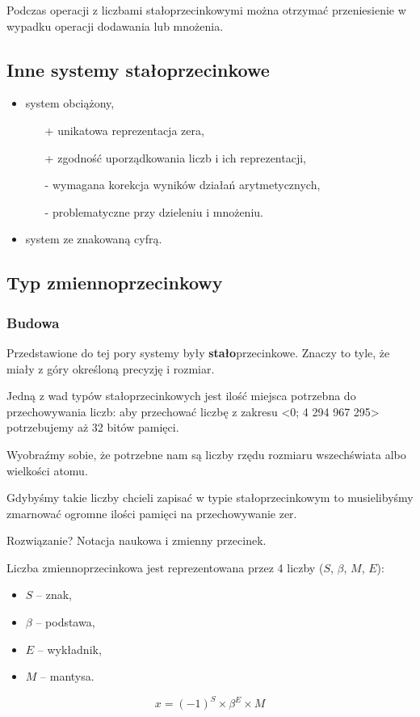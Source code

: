 Podczas operacji z liczbami stałoprzecinkowymi można otrzymać przeniesienie w wypadku operacji dodawania lub mnożenia.

\subsection{Inne systemy stałoprzecinkowe}
\begin{itemize}
	\setlength\itemsep{1pt}
	\item system obciążony,
	\begin{itemize}
		\setlength\itemsep{1pt}
		\item[+] unikatowa reprezentacja zera,
		\item[+] zgodność uporządkowania liczb i ich reprezentacji,
		\item[-] wymagana korekcja wyników działań arytmetycznych,
		\item[-] problematyczne przy dzieleniu i mnożeniu.
	\end{itemize}
	\item system ze znakowaną cyfrą.
\end{itemize}

\subsection{Typ zmiennoprzecinkowy}
\subsubsection{Budowa}
Przedstawione do tej pory systemy były \textbf{stało}przecinkowe.
Znaczy to tyle, że miały z góry określoną precyzję i rozmiar.

Jedną z wad typów stałoprzecinkowych jest ilość miejsca potrzebna do przechowywania liczb: aby przechować liczbę z zakresu <0; 4 294 967 295> potrzebujemy aż 32 bitów pamięci.

Wyobraźmy sobie, że potrzebne nam są liczby rzędu rozmiaru wszechświata albo wielkości atomu.

Gdybyśmy takie liczby chcieli zapisać w typie stałoprzecinkowym to musielibyśmy zmarnować ogromne ilości pamięci na przechowywanie zer.

Rozwiązanie? Notacja naukowa i zmienny przecinek.

Liczba zmiennoprzecinkowa jest reprezentowana przez 4 liczby ($S$, $\beta$, $M$, $E$):
\begin{itemize}
	\setlength\itemsep{1pt}
	\item $S$ -- znak,
	\item $\beta$ -- podstawa,
	\item $E$ -- wykładnik,
	\item $M$ -- mantysa.
\end{itemize}
\begin{equation}
x = (-1)^{S} \times \beta^{E} \times M
\end{equation}

